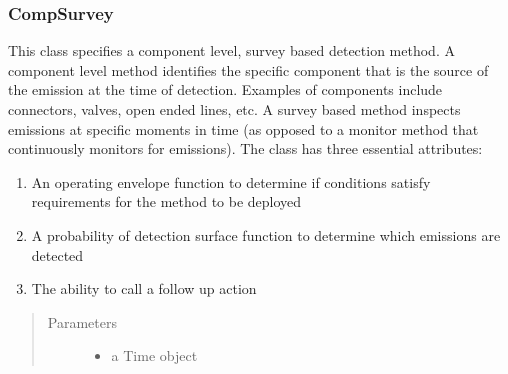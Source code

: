 \documentclass[letterpaper,10pt,english]{sphinxmanual}
\begin{document}
\subsubsection{CompSurvey}
\label{\detokenize{index:compsurvey}}

\begin{fulllineitems}
\label{\detokenize{index:feast.DetectionModules.comp_survey.CompSurvey}}
This class specifies a component level, survey based detection method.
A component level method identifies the specific component that is the source of the
emission at the time of detection. Examples of components include connectors, valves, open ended lines, etc.
A survey based method inspects emissions at specific moments in time (as opposed to a monitor method that
continuously monitors for emissions).
The class has three essential attributes:
\begin{enumerate}
%
\item {} 
An operating envelope function to determine if conditions satisfy requirements for the method to be deployed

\item {} 
A probability of detection surface function to determine which emissions are detected

\item {} 
The ability to call a follow up action

\end{enumerate}
\begin{quote}\begin{description}
\item[{Parameters}] \leavevmode\begin{itemize}
\item {} 
 \textendash{} a Time object


\end{itemize}
\end{description}
\end{quote}
\end{fulllineitems}
\end{document}
